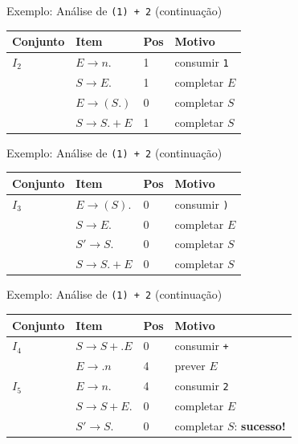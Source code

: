 \begin{frame}[fragile]{Exemplo: Análise de
    \texttt{(1) + 2} (continuação)}

    \begin{table}
        \begin{tabular}{l l l l}
            \hline
            Conjunto & Item & Pos & Motivo \\
            \hline
            \(I_2\) & \(E \to n .\) & 1 & consumir \texttt{1} \\
            & \(S \to E .\) & 1 & completar \(E\) \\
            & \(E \to (S . )\) & 0 & completar \(S\) \\
            & \(S \to S . +E\) & 1 & completar \(S\) \\
            \hline
        \end{tabular}
    \end{table}
\end{frame}

\begin{frame}[fragile]{Exemplo: Análise de
    \texttt{(1) + 2} (continuação)}

    \begin{table}
        \begin{tabular}{l l l l}
            \hline
            Conjunto & Item & Pos & Motivo \\
            \hline
            \(I_3\) & \(E \to (S) .\) & 0 & consumir \texttt{)} \\
            & \(S \to E .\) & 0 & completar \(E\) \\
            & \(S' \to S .\) & 0 & completar \(S\) \\
            & \(S \to S . +E\) & 0 & completar \(S\) \\
            \hline
        \end{tabular}
    \end{table}
\end{frame}

\begin{frame}[fragile]{Exemplo: Análise de
    \texttt{(1) + 2} (continuação)}

    \begin{table}
        \begin{tabular}{l l l l}
            \hline
            Conjunto & Item & Pos & Motivo \\
            \hline
            \(I_4\) & \(S \to S+ . E\) & 0 & consumir \texttt{+} \\
            & \(E \to . n\) & 4 & prever \(E\) \\
            \(I_5\) & \(E \to n .\) & 4 & consumir \texttt{2} \\
            & \(S \to S+E .\) & 0 & completar \(E\) \\
            & \(S' \to S .\) & 0 & completar \(S\): \textbf{sucesso!} \\
            \hline
        \end{tabular}
    \end{table}
\end{frame}

